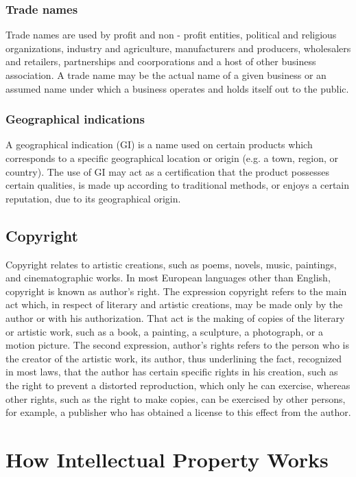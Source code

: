 \documentclass[a4paper,11pt]{article}
\begin{document}
\subsubsection{Trade names}
Trade names are used by profit and non - profit  entities, political and
religious organizations, industry and agriculture, manufacturers and producers,
wholesalers and retailers, partnerships and coorporations and a host of other
business association. A trade name may be the actual name of a given business
or an assumed name under which a business operates and holds itself out to the
public.\cite{tradename}

\subsubsection{Geographical indications}
A geographical indication (GI) is a name used on certain products which
corresponds to a specific geographical location or origin (e.g. a town, region,
or country). The use of GI may act as a certification that the product
possesses certain qualities, is made up according to traditional methods, or
enjoys a certain reputation, due to its geographical
origin.\cite{geographicalindications}

\subsection{Copyright}
Copyright relates to artistic creations, such as poems, novels, music,
paintings, and cinematographic works. In most European languages other than
English, copyright is known as author's right. The expression copyright refers to the main
act which, in respect of literary and artistic creations, may be made only by the
author or with his authorization. That act is the making of copies of the literary
or artistic work, such as a book, a painting, a sculpture, a photograph, or a
motion picture. The second expression, author’s rights refers to the person who 
is the creator of the artistic work, its author, thus underlining the fact, recognized
in most laws, that the author has certain specific rights in his creation, such as 
the right to prevent a distorted reproduction, which only he can exercise, whereas
other rights, such as the right to make copies, can be exercised by other persons,
for example, a publisher who has obtained a license to this effect from the author.

\section{How Intellectual Property Works}
\end{document}
